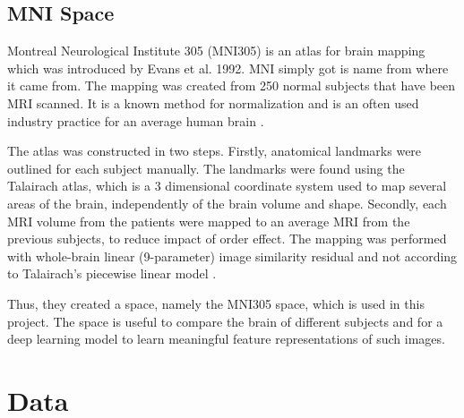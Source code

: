 \documentclass[12pt, fleqn, titlepage]{article}
\begin{document}
\subsection{MNI Space}
Montreal Neurological Institute 305 (MNI305) is an atlas for brain mapping which was introduced by Evans et al. 1992. MNI simply got is name from where it came from. The mapping was created from 250 normal subjects that have been MRI scanned. It is a known method for normalization and is an often used industry practice for an average human brain  \cite{evans}. 

The atlas was constructed in two steps. Firstly, anatomical landmarks were outlined for each subject manually. The landmarks were found using the Talairach atlas, which is a 3 dimensional coordinate system used to map several areas of the brain, independently of the brain volume and shape. Secondly, each MRI volume from the patients were mapped to an average MRI from the previous subjects, to reduce impact of order effect. %
The mapping was performed with whole-brain linear (9-parameter) image similarity residual and not according to Talairach's piecewise linear model \cite{collins}. 

Thus, they created a space, namely the MNI305 space, which is used in this project. The space is useful to compare the brain of different subjects and for a deep learning model to learn meaningful feature representations of such images. 


\section{Data} 
\end{document}
